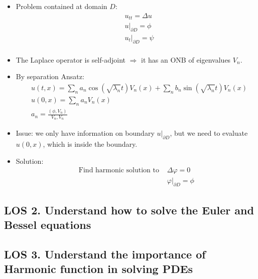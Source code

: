 \documentclass[12pt, a4paper]{article}
\begin{document}
\begin{itemize}
    \item Problem contained at domain $D$:
    \begin{align*}
        &u_{tt} = \Delta u\\
        &\left.u\right\rvert_{\partial D} = \phi\\
        &\left.u_t\right\rvert_{\partial D} = \psi\\
    \end{align*}
    \item The Laplace operator is self-adjoint $\Rightarrow$ it has an ONB of eigenvalues $V_n$.
    \item By separation Ansatz:
    \begin{align*}
        &u(t, x) = \sum_n a_n \cos(\sqrt{\lambda_n}t)V_n(x) + \sum_n b_n \sin(\sqrt{\lambda_n}t)V_n(x)\\
        &u(0, x) = \sum_n a_nV_n(x)\\
        &a_n = \frac{(\phi, V_n)}{V_n, V_n}
    \end{align*}
    \item Issue: we only have information on boundary $\left.u\right\rvert_{\partial D}$, but we need to evaluate $u(0, x)$, which is inside the boundary.
    \item Solution:
    \begin{align*}
        \text{Find harmonic solution to } &\Delta\varphi = 0\\
        &\left.\varphi\right\rvert_{\partial D} = \phi
    \end{align*}
\end{itemize}

\vspace{0.3em}

\subsection*{LOS 2. Understand how to solve the Euler and Bessel equations}
\vspace{0.3em}

\subsection*{LOS 3. Understand the importance of Harmonic function in solving PDEs}
\vspace{0.3em}
\end{document}
